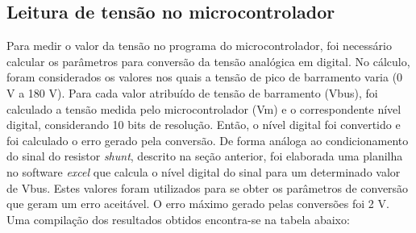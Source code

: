 \subsection{Leitura de tensão no microcontrolador}
Para medir o valor da tensão no programa do microcontrolador, foi necessário calcular os parâmetros para conversão da tensão analógica em digital. No cálculo, foram considerados os valores nos quais a tensão de pico de barramento varia (0 V a 180 V). Para cada valor atribuído de tensão de barramento (Vbus), foi calculado a tensão medida pelo microcontrolador (Vm) e o correspondente nível digital, considerando 10 bits de resolução. Então, o nível digital foi convertido e foi calculado o erro gerado pela conversão. De forma análoga ao condicionamento do sinal do resistor \textit{shunt}, descrito na seção anterior, foi elaborada uma planilha no software \textit{excel} que calcula o nível digital do sinal para um determinado valor de Vbus. Estes valores foram utilizados para se obter os parâmetros de conversão que geram um erro aceitável. O erro máximo gerado pelas conversões foi 2 V. Uma compilação dos resultados obtidos encontra-se na tabela abaixo:

